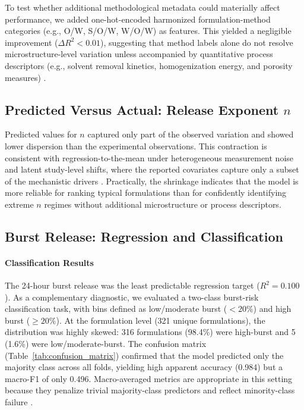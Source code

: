 \documentclass[preprint,12pt,authoryear]{elsarticle}
\begin{document}
\FloatBarrier

To test whether additional methodological metadata could materially affect performance, we added one-hot-encoded harmonized formulation-method categories (e.g., O/W, S/O/W, W/O/W) as features. This yielded a negligible improvement ($\Delta R^2 < 0.01$), suggesting that method labels alone do not resolve microstructure-level variation unless accompanied by quantitative process descriptors (e.g., solvent removal kinetics, homogenization energy, and porosity measures) \citep{Jain2000, KloseSiepmann2006Porosity, Yoo2020Burst}.

\subsection{\texorpdfstring{Predicted Versus Actual: Release Exponent $n$}{Predicted Versus Actual: Release Exponent n}}

Predicted values for $n$ captured only part of the observed variation and showed lower dispersion than the experimental observations. This contraction is consistent with regression-to-the-mean under heterogeneous measurement noise and latent study-level shifts, where the reported covariates capture only a subset of the mechanistic drivers \citep{Fredenberg2011, Klose2011Sink}. Practically, the shrinkage indicates that the model is more reliable for ranking typical formulations than for confidently identifying extreme $n$ regimes without additional microstructure or process descriptors.

\subsection{Burst Release: Regression and Classification}

\paragraph{Classification Results}
The 24-hour burst release was the least predictable regression target ($R^2 = 0.100$). As a complementary diagnostic, we evaluated a two-class burst-risk classification task, with bins defined as low/moderate burst ($<20\%$) and high burst ($\ge 20\%$). At the formulation level (321 unique formulations), the distribution was highly skewed: 316 formulations (98.4\%) were high-burst and 5 (1.6\%) were low/moderate-burst. The confusion matrix (Table~\ref{tab:confusion_matrix}) confirmed that the model predicted only the majority class across all folds, yielding high apparent accuracy (0.984) but a macro-F1 of only 0.496. Macro-averaged metrics are appropriate in this setting because they penalize trivial majority-class predictors and reflect minority-class failure \citep{SokolovaLapalme2009Metrics, HeGarcia2009Imbalanced}.
\end{document}
